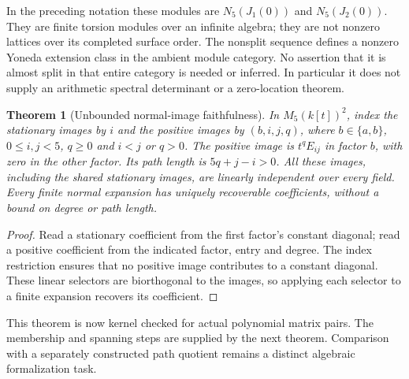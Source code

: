 \documentclass[11pt]{article}
\newtheorem{theorem}{Theorem}[section]
\theoremstyle{definition}\newtheorem{definition}[theorem]{Definition}
\theoremstyle{remark}\newtheorem{remark}[theorem]{Remark}
\begin{document}
In the preceding notation these modules are $N_5(J_1(0))$ and
$N_5(J_2(0))$. They are finite torsion modules over an infinite algebra;
they are not nonzero lattices over its completed surface order. The
nonsplit sequence defines a nonzero Yoneda extension class in the ambient
module category. No assertion that it is almost split in that entire
category is needed or inferred. In particular it does not supply an
arithmetic spectral determinant or a zero-location theorem.


\begin{theorem}[Unbounded normal-image faithfulness]\label{bre:normal-faithful}
In $M_5(k[t])^2$, index the stationary images by $i$ and the positive
images by $(b,i,j,q)$, where $b\in\{a,b\}$, $0\leq i,j<5$, $q\geq0$
and $i<j$ or $q>0$. The positive image is $t^qE_{ij}$ in factor $b$,
with zero in the other factor. Its path length is $5q+j-i>0$.
All these images, including the shared stationary images, are linearly
independent over every field. Every finite normal expansion has uniquely
recoverable coefficients, without a bound on degree or path length.
\end{theorem}
\begin{proof}
Read a stationary coefficient from the first factor's constant diagonal;
read a positive coefficient from the indicated factor, entry and degree.
The index restriction ensures that no positive image contributes to a
constant diagonal. These linear selectors are biorthogonal to the images,
so applying each selector to a finite expansion recovers its coefficient.
\end{proof}
This theorem is now kernel checked for actual polynomial matrix pairs.
The membership and spanning steps are supplied by the next theorem.
Comparison with a separately constructed path quotient remains a distinct
algebraic formalization task.
\end{document}
